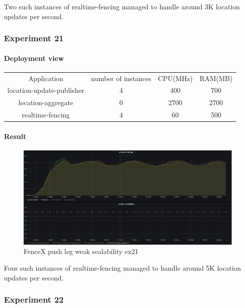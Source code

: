 \documentclass[a4]{report}
\begin{document}
    Two such instances of realtime-fencing managed to handle around 3K location updates per second.

    \subsubsection{Experiment 21}

    \paragraph{Deployment view}
    \begin{center}
        \begin{tabular}{ c c c c }
            Application               & number of instances & CPU(MHz) & RAM(MB) \\
            location-update-publisher & 4                   & 400      & 700     \\
            location-aggregate        & 0                   & 2700     & 2700    \\
            realtime-fencing          & 4                   & 60       & 500     \\
        \end{tabular}
    \end{center}

    \paragraph{Result}
    \begin{figure}[ht]
        \caption{FenceX push leg weak scalability ex21}
        \label{fig:ex21}
        \includegraphics[scale=0.4]{images/evaluation/ex21-benchmarking-ongoing-1per6sec.png}
    \end{figure}
    Four such instances of realtime-fencing managed to handle around 5K location updates per second.

    \subsubsection{Experiment 22}
\end{document}
